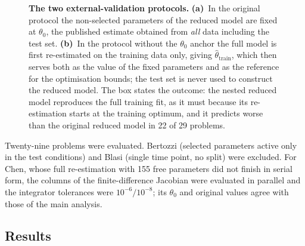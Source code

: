 \begin{figure}[H]
\caption{\textbf{The two external-validation protocols.} \textbf{(a)}~In the original protocol the non-selected parameters of the reduced model are fixed at $\theta_0$, the published estimate obtained from \emph{all} data including the test set. \textbf{(b)}~In the protocol without the $\theta_0$ anchor the full model is first re-estimated on the training data only, giving $\hat\theta_{\mathrm{train}}$, which then serves both as the value of the fixed parameters and as the reference for the optimisation bounds; the test set is never used to construct the reduced model. The box states the outcome: the nested reduced model reproduces the full training fit, as it must because its re-estimation starts at the training optimum, and it predicts worse than the original reduced model in 22 of 29 problems.}
\label{fig:nested_protocol}
\end{figure}

Twenty-nine problems were evaluated. Bertozzi (selected parameters active only in the test conditions) and Blasi (single time point, no split) were excluded. For Chen, whose full re-estimation with 155 free parameters did not finish in serial form, the columns of the finite-difference Jacobian were evaluated in parallel and the integrator tolerances were $10^{-6}/10^{-8}$; its $\theta_0$ and original values agree with those of the main analysis.

\subsection*{Results}

